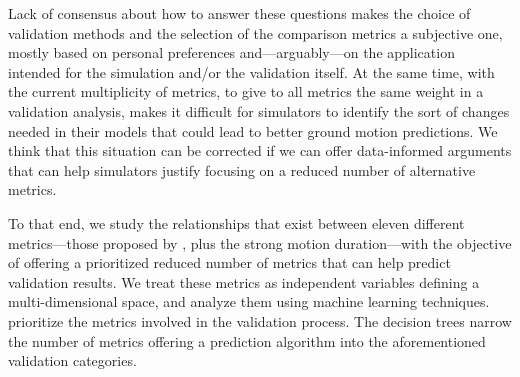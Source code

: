 
Lack of consensus about how to answer these questions makes the choice of validation methods and the selection of the comparison metrics a subjective one, mostly based on personal preferences and---arguably---on the application intended for the simulation and/or the validation itself. At the same time, with the current multiplicity of metrics, to give to all metrics the same weight in a validation analysis, makes it difficult for simulators to identify the sort of changes needed in their models that could lead to better ground motion predictions. We think that this situation can be corrected if we can offer data-informed arguments that can help simulators justify focusing on a reduced number of alternative metrics.

To that end, we study the relationships that exist between eleven different metrics---those proposed by \citet{Anderson_2004_Proc}, plus the strong motion duration---with the objective of offering a prioritized reduced number of metrics that can help predict validation results. We  treat these metrics as independent variables defining a multi-dimensional space, and analyze them using machine learning techniques.  prioritize the metrics involved in the validation process. The decision trees narrow the number of metrics offering a prediction algorithm into the aforementioned validation categories.

